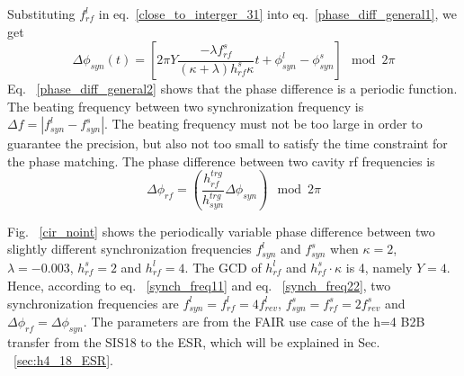 Substituting $f_{\mathit{rf}}^{l}$ in eq.~\ref{close_to_interger_31} into eq.~\ref{phase_diff_general1}, we get 
\begin{equation}
	\Delta \phi_\mathit{syn}(t)=[2\pi Y\frac{-{\lambda f_{\mathit{rf}}^{s}}}{(\kappa+\lambda)h^s_\mathit{rf}\kappa}t+\phi_\mathit{syn}^l-\phi^s_\mathit{syn}] \mod 2\pi \label{phase_diff_general2}
\end{equation}
Eq. ~\ref{phase_diff_general2} shows that the phase difference is a periodic function. The beating frequency between two synchronization frequency is $\Delta f=|f_{\mathit{syn}}^{l}-f_{\mathit{syn}}^{s}|$. The beating frequency must not be too large in order to guarantee the precision, but also not too small to satisfy the time constraint for the phase matching. The phase difference between two cavity rf frequencies is
\begin{equation}
\Delta \phi_\mathit{rf}=(\frac{h_{\mathit{rf}}^{trg}}{h_{\mathit{syn}}^{trg}}\Delta \phi_\mathit{syn}) \mod 2\pi 
\end{equation}

Fig. ~\ref{cir_noint} shows the periodically variable phase difference between two slightly different synchronization frequencies $f_{\mathit{syn}}^{l}$ and $f_{\mathit{syn}}^{s}$ when $\kappa=2$, $\lambda=-0.003$, $h^s_\mathit{rf}=2$ and $h^l_\mathit{rf}=4$. The GCD of $h^l_\mathit{rf}$ and $h^s_\mathit{rf} \cdot \kappa$ is 4, namely $Y=4$. Hence, according to eq. ~\ref{synch_freq11} and eq. ~\ref{synch_freq22}, two synchronization frequencies are $f_{\mathit{syn}}^{l}=f_{\mathit{rf}}^{l}=4f_{\mathit{rev}}^{l}$, $f_{\mathit{syn}}^{s}=f_{\mathit{rf}}^{s}=2f_{\mathit{rev}}^{s}$ and $\Delta \phi_\mathit{rf}=\Delta \phi_\mathit{syn}$.  The parameters are from the FAIR use case of the h=4 B2B transfer from the SIS18 to the ESR, which will be explained in Sec. ~\ref{sec:h4_18_ESR}. 

 

